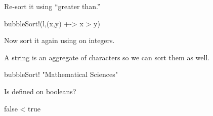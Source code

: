 \begin{xtc}
\begin{xtccomment}
Re-sort it using ``greater than.''
\end{xtccomment}
\begin{spadsrc}
bubbleSort!(l,(x,y) +-> x > y)
\end{spadsrc}
\begin{TeXOutput}
\begin{fricasmath}{3}
%
\end{fricasmath}
\end{TeXOutput}
\end{xtc}
\begin{xtc}
\begin{xtccomment}
Now sort it again using \spadop{<} on integers.
\end{xtccomment}
\begin{TeXOutput}
\begin{fricasmath}{4}
%
\end{fricasmath}
\end{TeXOutput}
\end{xtc}
\begin{xtc}
\begin{xtccomment}
A string is an aggregate of characters so we can sort them as well.
\end{xtccomment}
\begin{spadsrc}
bubbleSort! "Mathematical Sciences"
\end{spadsrc}
\begin{TeXOutput}
\begin{fricasmath}{5}
%
\end{fricasmath}
\end{TeXOutput}
\end{xtc}
\begin{xtc}
\begin{xtccomment}
Is \spadop{<} defined on booleans?
\end{xtccomment}
\begin{spadsrc}
false < true
\end{spadsrc}
\begin{TeXOutput}
\begin{fricasmath}{6}
%
\end{fricasmath}
\end{TeXOutput}
\end{xtc}
